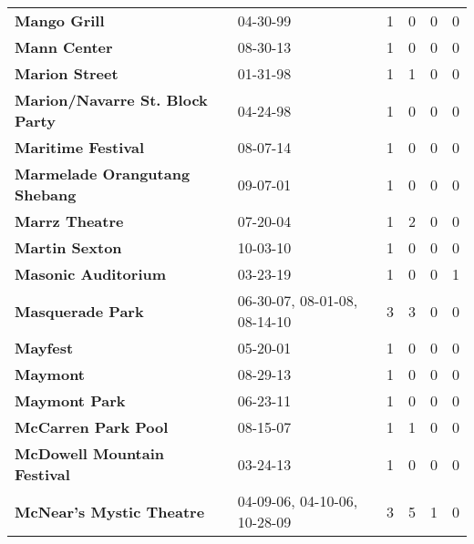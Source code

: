 \begin{supertabular}{llllll}
                                                 \textbf{Mango Grill} &                      04-30-99 &  1 &   0 &  0 &  0 \\
                                                 \textbf{Mann Center} &                      08-30-13 &  1 &   0 &  0 &  0 \\
                                               \textbf{Marion Street} &                      01-31-98 &  1 &   1 &  0 &  0 \\
                              \textbf{Marion/Navarre St. Block Party} &                      04-24-98 &  1 &   0 &  0 &  0 \\
                                           \textbf{Maritime Festival} &                      08-07-14 &  1 &   0 &  0 &  0 \\
                                \textbf{Marmelade Orangutang Shebang} &                      09-07-01 &  1 &   0 &  0 &  0 \\
                                               \textbf{Marrz Theatre} &                      07-20-04 &  1 &   2 &  0 &  0 \\
                                               \textbf{Martin Sexton} &                      10-03-10 &  1 &   0 &  0 &  0 \\
                                          \textbf{Masonic Auditorium} &                      03-23-19 &  1 &   0 &  0 &  1 \\
                                             \textbf{Masquerade Park} &  06-30-07, 08-01-08, 08-14-10 &  3 &   3 &  0 &  0 \\
                                                     \textbf{Mayfest} &                      05-20-01 &  1 &   0 &  0 &  0 \\
                                                     \textbf{Maymont} &                      08-29-13 &  1 &   0 &  0 &  0 \\
                                                \textbf{Maymont Park} &                      06-23-11 &  1 &   0 &  0 &  0 \\
                                          \textbf{McCarren Park Pool} &                      08-15-07 &  1 &   1 &  0 &  0 \\
                                  \textbf{McDowell Mountain Festival} &                      03-24-13 &  1 &   0 &  0 &  0 \\
                                     \textbf{McNear's Mystic Theatre} &  04-09-06, 04-10-06, 10-28-09 &  3 &   5 &  1 &  0 \\

\end{supertabular}
